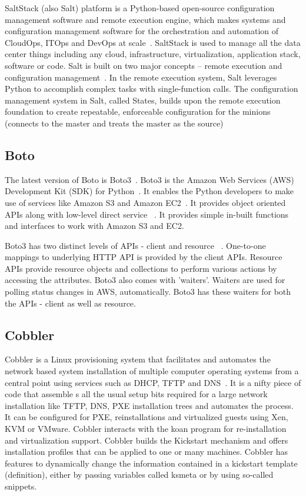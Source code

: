 {SaltStack (also Salt) platform is a Python-based open-source
configuration management software and remote execution engine, which
makes systems and configuration management software for the
orchestration and automation of CloudOps, ITOps and DevOps at
scale~\cite{www-saltstack}. SaltStack is used to manage all the data
center things including any cloud, infrastructure, virtualization,
application stack, software or code. Salt is built on two major
concepts -- remote execution and configuration
management~\cite{SaltStack-book}. In the remote execution system, Salt
leverages Python to accomplish complex tasks with single-function
calls. The configuration management system in Salt, called States,
builds upon the remote execution foundation to create repeatable,
enforceable configuration for the minions (connects to the master and
treats the master as the source)

     \pv
     
\subsection{Boto}

The latest version of Boto is Boto3~\cite{www-boto}.  Boto3 is the
Amazon Web Services (AWS) Development Kit (SDK) for
Python~\cite{www-boto-github}. It enables the Python developers to
make use of services like Amazon S3 and Amazon
EC2~\cite{www-boto-amazon-python-sdk}.  It provides object oriented
APIs along with low-level direct service
~\cite{www-boto3-documentation}.  It provides simple in-built
functions and interfaces to work with Amazon S3 and EC2.

Boto3 has two distinct levels of APIs - client and resource
~\cite{www-boto-amazon-python-sdk}. One-to-one mappings to underlying
HTTP API is provided by the client APIs. Resource APIs provide
resource objects and collections to perform various actions by
accessing the attributes.  Boto3 also comes with 'waiters'. Waiters
are used for polling status changes in AWS, automatically. Boto3 has
these waiters for both the APIs - client as well as resource.
     
\subsection{Cobbler}

Cobbler is a Linux provisioning system that facilitates and automates
the network based system installation of multiple computer operating
systems from a central point using services such as DHCP, TFTP and
DNS~\cite{www-cobbler}. It is a nifty piece of code that assemble s
all the usual setup bits required for a large network installation
like TFTP, DNS, PXE installation trees and automates the process. It
can be configured for PXE, reinstallations and virtualized guests
using Xen, KVM or VMware.  Cobbler interacts with the koan program for
re-installation and virtualization support.  Cobbler builds the
Kickstart mechanism and offers installation profiles that can be
applied to one or many machines.  Cobbler has features to dynamically
change the information contained in a kickstart template (definition),
either by passing variables called ksmeta or by using so-called
snippets.

}
